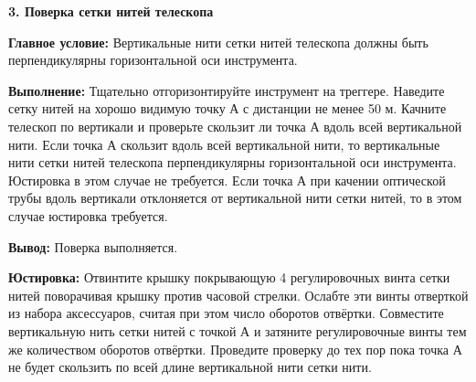 \documentclass[a4paper]{article}
\begin{document}
\begin{newpage}
{        \par\textbf{3. Поверка сетки нитей телескопа}
        \par\textbf{Главное условие:} Вертикальные нити сетки нитей телескопа должны быть перпендикулярны горизонтальной оси инструмента.
        \par\textbf{Выполнение:} Тщательно отгоризонтируйте инструмент на треггере. Наведите сетку нитей на хорошо видимую точку А с дистанции не менее 50 м. Качните телескоп по вертикали и проверьте скользит ли точка А вдоль всей вертикальной нити. Если точка А скользит вдоль всей вертикальной нити, то вертикальные нити сетки нитей телескопа перпендикулярны горизонтальной оси инструмента. Юстировка в этом случае не требуется. Если точка А при качении оптической трубы вдоль вертикали отклоняется от вертикальной нити сетки нитей, то в этом случае юстировка требуется.
        \par\textbf{Вывод:} Поверка выполняется.
        \par\textbf{Юстировка:} Отвинтите крышку покрывающую 4 регулировочных винта сетки нитей поворачивая крышку против часовой стрелки. Ослабте эти винты отверткой из набора аксессуаров, считая при этом число оборотов отвёртки. Совместите вертикальную нить сетки нитей с точкой А и затяните регулировочные винты тем же количеством оборотов отвёртки. Проведите проверку до тех пор пока точка А не будет скользить по всей длине вертикальной нити сетки нити.\\
    
}
\end{newpage}
\end{document}
